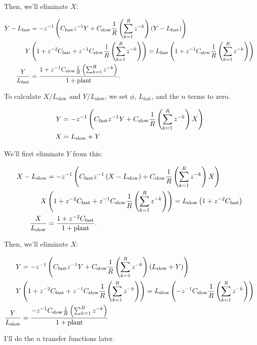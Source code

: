 \documentclass{article}
\begin{document}
    Then, we'll eliminate $X$:

    \begin{align*}
        Y - L_{\text{fast}} &= -z^{-1} \left(C_{\text{fast}} z^{-1} Y + C_{\text{slow}} \frac{1}{R} \left(\sum_{k=1}^R z^{-k}\right) (Y - L_{\text{fast}})\right) \\
        Y &\left(1 + z^{-2} C_{\text{fast}} + z^{-1} C_\text{slow} \frac{1}{R} \left(\sum_{k=1}^R z^{-k}\right)\right) = L_{\text{fast}} \left(1 + z^{-1} C_{\text{slow}} \frac{1}{R} \left(\sum_{k=1}^R z^{-k}\right)\right)\\
        \frac{Y}{L_\text{fast}} &= \frac{1 + z^{-1} C_\text{slow} \frac{1}{R} \left(\sum_{k=1}^R z^{-k}\right)}{1 + \text{plant}}.
    \end{align*}

    To calculate $X/L_{\text{slow}}$ and $Y/L_{\text{slow}}$, we set $\phi$, $L_{\text{fast}}$, and the $n$ terms to zero.

    \begin{align*}
        Y &= -z^{-1} \left(C_{\text{fast}} z^{-1} Y + C_{\text{slow}} \frac{1}{R} \left(\sum_{k=1}^R z^{-k}\right) X\right) \\
        X &= L_{\text{slow}} + Y \\
    \end{align*}

    We'll first eliminate $Y$ from this:

    \begin{align*}
        X - L_{\text{slow}} &= -z^{-1} \left(C_{\text{fast}} z^{-1} \left(X - L_{\text{slow}}\right) + C_{\text{slow}} \frac{1}{R} \left(\sum_{k=1}^R z^{-k}\right) X\right) \\
        X &\left(1 + z^{-2} C_{\text{fast}} + z^{-1} C_{\text{slow}} \frac{1}{R} \left(\sum_{k=1}^R z^{-k}\right)\right) = L_{\text{slow}} \left(1 + z^{-2} C_{\text{fast}}\right)\\
        \frac{X}{L_{\text{slow}}} &= \frac{1 + z^{-2} C_{\text{fast}}}{1 + \text{plant}}.
    \end{align*}

    Then, we'll eliminate $X$:

    \begin{align*}
        Y &= -z^{-1} \left(C_{\text{fast}} z^{-1} Y + C_{\text{slow}} \frac{1}{R} \left(\sum_{k=1}^R z^{-k}\right) (L_{\text{slow}} + Y)\right) \\
        Y &\left(1 + z^{-2} C_{\text{fast}} + z^{-1} C_{\text{slow}} \frac{1}{R} \left(\sum_{k=1}^R z^{-k}\right)\right) = L_{\text{slow}} \left(-z^{-1} C_{\text{slow}} \frac{1}{R} \left(\sum_{k=1}^R z^{-k}\right)\right) \\ 
        \frac{Y}{L_{\text{slow}}} &= \frac{-z^{-1} C_{\text{slow}} \frac{1}{R} \left(\sum_{k=1}^R z^{-k}\right)}{1 + \text{plant}}
    \end{align*}

    I'll do the $n$ transfer functions later.
\end{document}

